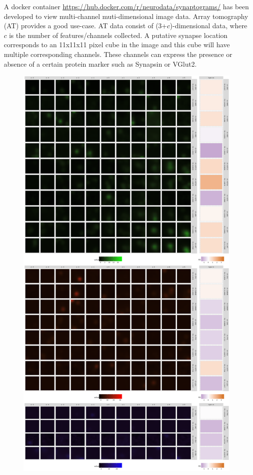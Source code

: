\documentclass[simplex.tex]{subfiles}
\begin{document}
A docker container
\href{https://hub.docker.com/r/neurodata/synaptograms/}{https://hub.docker.com/r/neurodata/synaptograms/}
has been developed to view multi-channel
muti-dimensional image data.  Array tomography (AT) provides a good
use-case. AT data consist of (3+$c$)-dimensional data, where $c$ is the
number of features/channels collected. 
%
A putative synapse location corresponds to an 11x11x11
pixel cube in the image and this cube will have multiple corresponding
channels. These channels can express the presence or absence of a
certain protein marker such as Synapsin or VGlut2.~
%
\begin{figure}[!ht]
\begin{cframed}
\centering
\includegraphics[width=0.55\textheight, clip = true, trim = 0in 18in 0in 0in]{../../figs/exampleC1212testkristina15x108_y5965_z22.png}

\end{cframed}
\end{figure}
\end{document}
